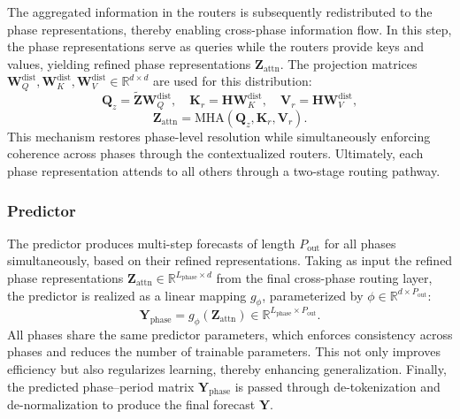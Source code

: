 The aggregated information in the routers is subsequently redistributed to the phase representations, thereby enabling cross-phase information flow. In this step, the phase representations serve as queries while the routers provide keys and values, yielding refined phase representations $\mathbf{Z}_{\text{attn}}$. The projection matrices $\mathbf{W}_Q^{\text{dist}}, \mathbf{W}_K^{\text{dist}}, \mathbf{W}_V^{\text{dist}}\in\mathbb{R}^{d\times d}$ are used for this distribution:  
\begin{equation}
\mathbf{Q}_z=\tilde{\mathbf{Z}}\mathbf{W}_Q^{\text{dist}},\quad
\mathbf{K}_r=\mathbf{H}\mathbf{W}_K^{\text{dist}},\quad
\mathbf{V}_r=\mathbf{H}\mathbf{W}_V^{\text{dist}},
\end{equation}
\begin{equation}
\mathbf{Z}_{\text{attn}}=\mathrm{MHA}\!\left(\mathbf{Q}_z,\mathbf{K}_r,\mathbf{V}_r\right).
\end{equation}
This mechanism restores phase-level resolution while simultaneously enforcing coherence across phases through the contextualized routers. 
Ultimately, each phase representation attends to all others through a two-stage routing pathway.


\subsubsection{Predictor}
\label{subsubsec:phase-predictor}

The predictor produces multi-step forecasts of length $P_{\text{out}}$ for all phases simultaneously, based on their refined representations. Taking as input the refined phase representations $\mathbf{Z}_{\text{attn}} \in \mathbb{R}^{L_{\text{phase}}\times d}$ from the final cross-phase routing layer, the predictor is realized as a linear mapping $g_{\phi}$, parameterized by $\phi \in \mathbb{R}^{d \times P_{\text{out}}}$:  
\begin{equation}
\mathbf{Y}_{\text{phase}} = g_{\phi}(\mathbf{Z}_{\text{attn}}) 
\in \mathbb{R}^{L_{\text{phase}}\times P_{\text{out}}}.
\label{eq:phase-predictor}
\end{equation}
All phases share the same predictor parameters, which enforces consistency across phases and reduces the number of trainable parameters. This not only improves efficiency but also regularizes learning, thereby enhancing generalization. Finally, the predicted phase--period matrix $\mathbf{Y}_{\text{phase}}$ is passed through de-tokenization and de-normalization to produce the final forecast $\mathbf{Y}$.




